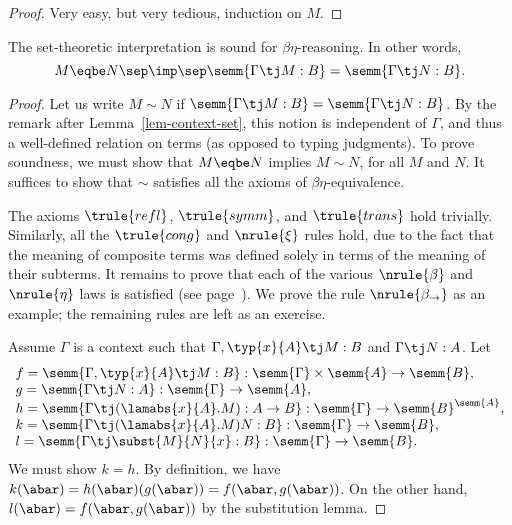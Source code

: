 \documentclass[12pt]{article}
\begin{document}
\begin{proof}
  Very easy, but very tedious, induction on $M$.\eot
\end{proof}

\begin{proposition}[Soundness]
  The set-theoretic interpretation is sound for
  $\beta\eta$-reasoning. In other words,
  \[ M\eqbe N \sep\imp\sep \semm{\Gamma\tj M:B}=\semm{\Gamma\tj N:B}. 
  \]
\end{proposition}

\begin{proof}
  Let us write $M\sim N$ if $\semm{\Gamma\tj M:B}=\semm{\Gamma\tj
    N:B}$. By the remark after Lemma~\ref{lem-context-set}, this
  notion is independent of $\Gamma$, and thus a well-defined relation
  on terms (as opposed to typing judgments). To prove soundness, we
  must show that $M\eqbe N$ implies $M\sim N$, for all $M$ and $N$.
  It suffices to show that $\sim$ satisfies all the axioms of
  $\beta\eta$-equivalence.
  
  The axioms $\trule{refl}$, $\trule{symm}$, and $\trule{trans}$ hold
  trivially. Similarly, all the $\trule{cong}$ and $\nrule{\xi}$ rules
  hold, due to the fact that the meaning of composite terms was
  defined solely in terms of the meaning of their subterms. It remains
  to prove that each of the various $\nrule{\beta}$ and $\nrule{\eta}$
  laws is satisfied (see page~\pageref{page-typed-reductions}). We prove the rule
  $\nrule{\beta_{\to}}$ as an example; the remaining rules are left as
  an exercise.

  Assume $\Gamma$ is a context such that $\Gamma,\typ{x}{A}\tj M:B$
  and $\Gamma\tj N:A$. Let
  \[ \begin{array}{l}
    f = \semm{\Gamma,\typ{x}{A}\tj M:B}
    : \semm{\Gamma}\times\semm{A}\to\semm{B},\\
    g = \semm{\Gamma\tj N:A}
    : \semm{\Gamma}\to\semm{A}, \\
    h = \semm{\Gamma\tj (\lamabs{x}{A}.M):A\to B}
    : \semm{\Gamma}\to\semm{B}^{\semm{A}}, \\
    k = \semm{\Gamma\tj (\lamabs{x}{A}.M)N:B} :
    \semm{\Gamma}\to\semm{B},\\
    l = \semm{\Gamma\tj \subst{M}{N}{x} : B} :
    \semm{\Gamma}\to\semm{B}.
  \end{array}
  \]
  We must show $k=h$. By definition, we have $k(\abar)=h(\abar)(g(\abar))=
  f(\abar,g(\abar))$. On the other hand, $l(\abar)=f(\abar,g(\abar))$
  by the substitution lemma. \eot
\end{proof}
\end{document}
